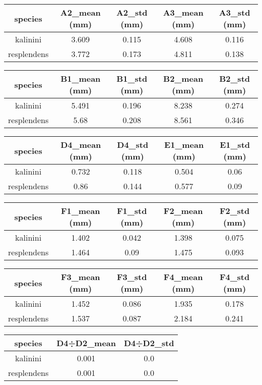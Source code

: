 \begin{table}[H]
\centering
\begin{tabular}{|c|c|c|c|c|}
\hline
species & A2\_mean (mm) & A2\_std (mm) & A3\_mean (mm) & A3\_std (mm) \\ 
\hline
kalinini & 3.609 & 0.115 & 4.608 & 0.116 \\ 
resplendens & 3.772 & 0.173 & 4.811 & 0.138 \\ 
\hline
\end{tabular}
\end{table}
\begin{table}[H]
\centering
\begin{tabular}{|c|c|c|c|c|}
\hline
species & B1\_mean (mm) & B1\_std (mm) & B2\_mean (mm) & B2\_std (mm) \\ 
\hline
kalinini & 5.491 & 0.196 & 8.238 & 0.274 \\ 
resplendens & 5.68 & 0.208 & 8.561 & 0.346 \\ 
\hline
\end{tabular}
\end{table}
\begin{table}[H]
\centering
\begin{tabular}{|c|c|c|c|c|}
\hline
species & D4\_mean (mm) & D4\_std (mm) & E1\_mean (mm) & E1\_std (mm) \\ 
\hline
kalinini & 0.732 & 0.118 & 0.504 & 0.06 \\ 
resplendens & 0.86 & 0.144 & 0.577 & 0.09 \\ 
\hline
\end{tabular}
\end{table}
\begin{table}[H]
\centering
\begin{tabular}{|c|c|c|c|c|}
\hline
species & F1\_mean (mm) & F1\_std (mm) & F2\_mean (mm) & F2\_std (mm) \\ 
\hline
kalinini & 1.402 & 0.042 & 1.398 & 0.075 \\ 
resplendens & 1.464 & 0.09 & 1.475 & 0.093 \\ 
\hline
\end{tabular}
\end{table}
\begin{table}[H]
\centering
\begin{tabular}{|c|c|c|c|c|}
\hline
species & F3\_mean (mm) & F3\_std (mm) & F4\_mean (mm) & F4\_std (mm) \\ 
\hline
kalinini & 1.452 & 0.086 & 1.935 & 0.178 \\ 
resplendens & 1.537 & 0.087 & 2.184 & 0.241 \\ 
\hline
\end{tabular}
\end{table}
\begin{table}[H]
\centering
\begin{tabular}{|c|c|c|}
\hline
species & D4÷D2\_mean & D4÷D2\_std \\ 
\hline
kalinini & 0.001 & 0.0 \\ 
resplendens & 0.001 & 0.0 \\ 
\hline
\end{tabular}
\end{table}

